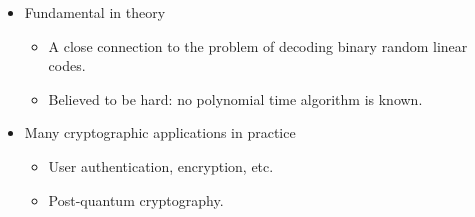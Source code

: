 \documentclass{beamer}
\begin{document}
\begin{frame}
	\begin{itemize}
		\item Fundamental in theory%
		\begin{itemize}
			\item A close connection to the problem of decoding binary random linear codes.
			\item Believed to be hard: no polynomial time algorithm is known.
		\end{itemize}	
	\end{itemize}
	
	\vspace{0.2cm}
	\begin{itemize}
		\item Many cryptographic applications in practice %
		\begin{itemize}
			\item User authentication, encryption, etc.
			\item Post-quantum cryptography.%
		\end{itemize}
	\end{itemize}
\end{frame}


\end{document}
